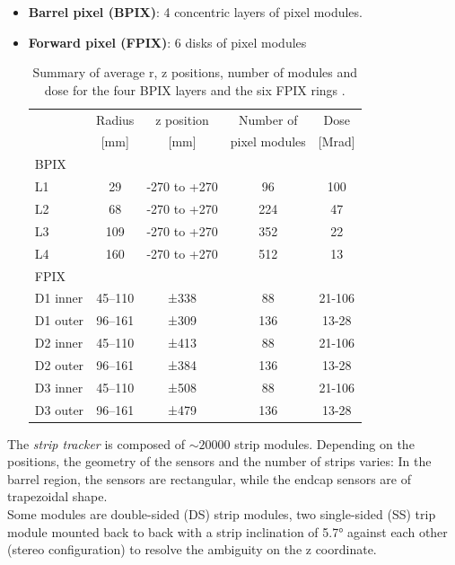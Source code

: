 \begin{itemize}
    \item \textbf{Barrel pixel (BPIX)}: 4 concentric layers of pixel modules.
    \item \textbf{Forward pixel (FPIX)}: 6 disks of pixel modules
    \begin{table}[h!]
        \centering
        \begin{tabular}{l|c|c|c|c}
            & Radius & z position & Number of & Dose \\
            & [mm]   &  [mm]    &  pixel modules & [Mrad]\\
            \hline
            BPIX & \multicolumn{4}{c}{ } \\
            \hline
            L1&29&-270 to +270&96& 100 \\
            L2&68&-270 to +270&224& 47\\
            L3&109&-270 to +270&352& 22\\
            L4&160&-270 to +270&512& 13 \\
            \hline
            FPIX & \multicolumn{4}{c}{ } \\
            \hline
            D1 inner&45–110&±338&88 & 21-106\\
            D1 outer&96–161&±309&136 & 13-28\\
            D2 inner&45–110&±413&88 & 21-106\\
            D2 outer&96–161&±384&136 & 13-28\\
            D3 inner&45–110&±508&88 & 21-106\\
            D3 outer&96–161&±479&136 & 13-28\\
        \end{tabular}
        \caption{Summary of average r, z positions, number of modules and dose for the four BPIX layers and
the six FPIX rings \cite{Adam2021TheUpgrade}.}
        \label{tab:pixel_tracker}
    \end{table}
\end{itemize}
The \emph{strip tracker} \cite{Friedl2001TheReadout} is composed of  $\sim 20000$ strip modules. Depending on the positions, the geometry of the sensors and the number of strips varies: In the barrel region, the sensors are rectangular, while the endcap sensors are of trapezoidal shape.\\
Some modules are double-sided (DS) strip modules, \ie two single-sided (SS) trip module mounted back to back with a strip inclination of 5.7° against each other (stereo configuration) to resolve the ambiguity on the z coordinate.


